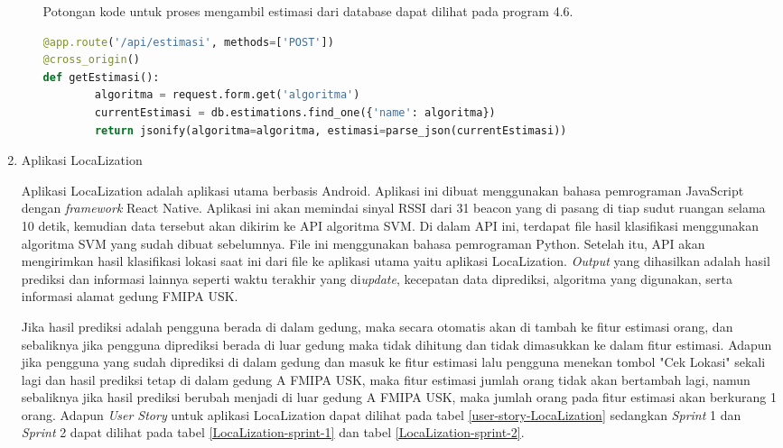 \begin{enumerate}[1.]
\begin{enumerate}[a.]
		            Potongan kode untuk proses mengambil estimasi dari database dapat dilihat pada program 4.6.
		            \begin{lstlisting}[language=Python]
@app.route('/api/estimasi', methods=['POST'])
@cross_origin()
def getEstimasi():
		algoritma = request.form.get('algoritma')
		currentEstimasi = db.estimations.find_one({'name': algoritma})
		return jsonify(algoritma=algoritma, estimasi=parse_json(currentEstimasi))		\end{lstlisting}
	      \end{enumerate}
	\item Aplikasi LocaLization
	      \par Aplikasi LocaLization adalah aplikasi utama berbasis Android. Aplikasi ini dibuat menggunakan bahasa pemrograman JavaScript dengan \textit{framework} React Native. Aplikasi ini akan memindai sinyal RSSI dari 31 beacon yang di pasang di tiap sudut ruangan selama 10 detik, kemudian data tersebut akan dikirim ke API algoritma SVM. Di dalam API ini, terdapat file hasil klasifikasi menggunakan algoritma SVM yang sudah dibuat sebelumnya. File ini menggunakan bahasa pemrograman Python. Setelah itu, API akan mengirimkan hasil klasifikasi lokasi saat ini dari file ke aplikasi utama yaitu aplikasi LocaLization. \textit{Output} yang dihasilkan adalah hasil prediksi dan informasi lainnya seperti waktu terakhir yang di\textit{update}, kecepatan data diprediksi, algoritma yang digunakan, serta informasi alamat gedung FMIPA USK.
	      \par Jika hasil prediksi adalah pengguna berada di dalam gedung, maka secara otomatis akan di tambah ke fitur estimasi orang, dan sebaliknya jika pengguna diprediksi berada di luar gedung maka tidak dihitung dan tidak dimasukkan ke dalam fitur estimasi. Adapun jika pengguna yang sudah diprediksi di dalam gedung dan masuk ke fitur estimasi lalu pengguna menekan tombol "Cek Lokasi" sekali lagi dan hasil prediksi tetap di dalam gedung A FMIPA USK, maka fitur estimasi jumlah orang tidak akan bertambah lagi, namun sebaliknya jika hasil prediksi berubah menjadi di luar gedung A FMIPA USK, maka jumlah orang pada fitur estimasi akan berkurang 1 orang. Adapun \textit{User Story} untuk aplikasi LocaLization dapat dilihat pada tabel \ref{user-story-LocaLization} sedangkan \textit{Sprint} 1 dan \textit{Sprint} 2 dapat dilihat pada tabel \ref{LocaLization-sprint-1} dan tabel \ref{LocaLization-sprint-2}.


\end{enumerate}
